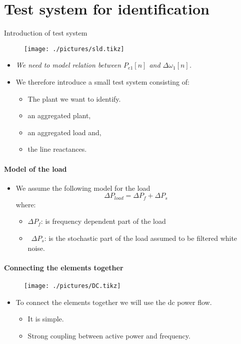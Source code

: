 \section{Test system for identification}
\begin{frame}{Introduction of test system}
		\begin{figure}[t]
		\texttt{[image: ./pictures/sld.tikz]}
	\end{figure}
	\begin{itemize}
			\item \emph{\color{red}We need to model relation between $P_{e1}[n]$ and $\Delta \omega_1[n]$.}
		\item We therefore introduce a small test system consisting of:
			\begin{itemize}
				\item The plant we want to identify.
				\item an aggregated plant,
				\item an aggregated load and,
				\item the line reactances.
			\end{itemize}
		\end{itemize}
\end{frame}
\begin{frame}{\secname}
	\framesubtitle{Model of the load}
	\begin{itemize}
		\item We assume the following model for the load
			\begin{equation}
				\Delta P_{load} = \Delta P_f + \Delta P_s
			\end{equation}
		where:
		\begin{itemize}
			\item $\Delta P_f$: is frequency dependent part of the load
			\item $\Delta P_s$: is the stochastic part of the load assumed to be filtered white noise.
		\end{itemize}
	\end{itemize}
\end{frame}
\begin{frame}{\secname}
	\framesubtitle{Connecting the elements together}
	\begin{figure}[t]
		\texttt{[image: ./pictures/DC.tikz]}
	\end{figure}
	\begin{itemize}
		\item To connect the elements together we will use the dc power flow.
		\begin{itemize}
			\item It is simple.
			\item Strong coupling between active power and frequency.
		\end{itemize}
	\end{itemize}
\end{frame}
